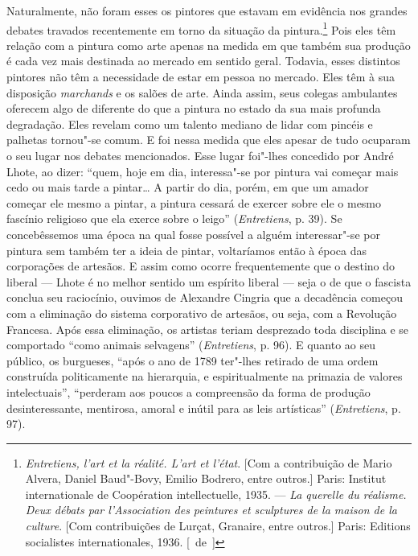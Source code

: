Naturalmente, não foram esses os pintores que estavam em evidência nos
grandes debates travados recentemente em torno da situação da
pintura.\footnote{\emph{Entretiens, l'art et la réalité. L'art et
  l'état}. {[}Com a contribuição de Mario Alvera, Daniel Baud"-Bovy,
  Emilio Bodrero, entre outros.{]} Paris: Institut internationale de
  Coopération intellectuelle, 1935. --- \emph{La querelle du réalisme.
  Deux débats par l'Association des peintures et sculptures de la maison
  de la culture}. {[}Com contribuições de Lurçat, Granaire, entre
  outros.{]} Paris: Editions socialistes internationales, 1936. [~de~]} Pois eles
têm relação com a pintura como arte apenas na medida em
que também sua produção é cada vez mais destinada ao mercado em sentido
geral. Todavia, esses distintos pintores não têm a necessidade de estar
em pessoa no mercado. Eles têm à sua disposição \emph{marchands} e os
salões de arte. Ainda assim, seus colegas ambulantes oferecem algo de
diferente do que a pintura no estado da sua mais profunda degradação.
Eles revelam como um talento mediano de lidar com pincéis e palhetas
tornou"-se comum. E foi nessa medida que eles apesar de tudo ocuparam o seu
lugar nos debates mencionados. Esse lugar foi"-lhes concedido por André
Lhote, ao dizer: ``quem, hoje em dia, interessa"-se por pintura vai começar
mais cedo ou mais tarde a pintar\ldots{} A partir do dia, porém, em que um
amador começar ele mesmo a pintar, a pintura cessará de exercer sobre ele o
mesmo fascínio religioso que ela exerce sobre o leigo''
(\emph{Entretiens}, p. 39). Se concebêssemos uma época na qual fosse
possível a alguém interessar"-se por pintura sem também ter a ideia de pintar, voltaríamos então à época das corporações de
artesãos. E assim como ocorre frequentemente que o destino do liberal --- Lhote é
no melhor sentido um espírito liberal --- seja o de que o fascista conclua seu
raciocínio, ouvimos de Alexandre Cingria que a decadência começou com a
eliminação do sistema corporativo de artesãos, ou seja, com a Revolução
Francesa. Após essa eliminação, os artistas teriam desprezado toda
disciplina e se comportado ``como animais selvagens''
(\emph{Entretiens}, p. 96). E quanto ao seu público, os burgueses,
``após o ano de 1789 ter"-lhes retirado de uma ordem construída
politicamente na hierarquia, e espiritualmente na primazia de valores
intelectuais'', ``perderam aos poucos a compreensão da forma de produção
desinteressante, mentirosa, amoral e inútil para as leis artísticas'' (\emph{Entretiens}, p. 97).

